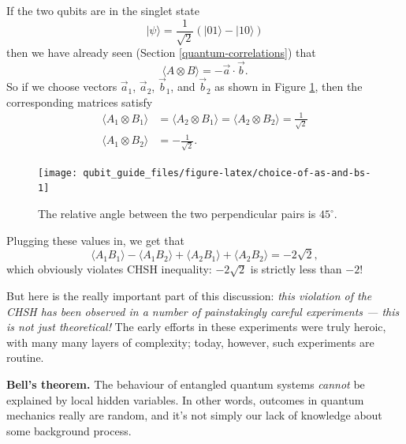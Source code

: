 \documentclass[fleqn,a4paper]{article}
\renewcommand{\footnote}[1]{\sidenotetext[{\color{white}0}\!\!]{\footnotesize #1}}
\newenvironment{idea}{\everypar{\setlength{\parindent}{1.5em}}}{}
\theoremstyle{definition}
\theoremstyle{definition}
\theoremstyle{definition}
\theoremstyle{definition}
\theoremstyle{remark}
\begin{document}
If the two qubits are in the singlet state
\[
  |\psi\rangle
  = \frac{1}{\sqrt{2}} \left( |01\rangle-|10\rangle \right)
\]
then we have already seen (Section \ref{quantum-correlations}) that
\[
  \langle A\otimes B\rangle = -\vec{a}\cdot\vec{b}.
\]
So if we choose vectors \(\vec{a}_1\), \(\vec{a}_2\), \(\vec{b}_1\), and \(\vec{b}_2\) as shown in Figure \ref{fig:choice-of-as-and-bs}, then the corresponding matrices\footnote{That is, \(A_1=\vec{a}_1\cdot\vec{\sigma}\), and so on.} satisfy
\[
\begin{aligned}
  \langle A_1\otimes B_1\rangle
  &= \langle A_2\otimes B_1\rangle
  = \langle A_2\otimes B_2\rangle
  = \frac{1}{\sqrt{2}}
\\\langle A_1\otimes B_2\rangle
  &= -\frac{1}{\sqrt{2}}.
\end{aligned}
\]



\begin{figure}[H]

{\centering \texttt{[image: qubit\_guide\_files/figure-latex/choice-of-as-and-bs-1]} 

}

\caption{The relative angle between the two perpendicular pairs is \(45^\circ\).}\label{fig:choice-of-as-and-bs}
\end{figure}

Plugging these values in, we get that
\[
  \langle A_1 B_1\rangle - \langle A_1 B_2\rangle + \langle A_2 B_1\rangle + \langle A_2 B_2\rangle
  = -2\sqrt{2},
\]
which obviously violates CHSH inequality: \(-2\sqrt{2}\) is strictly less than \(-2\)!

But here is the really important part of this discussion: \emph{this violation of the CHSH has been observed in a number of painstakingly careful experiments --- this is not just theoretical!}
The early efforts in these experiments were truly heroic, with many many layers of complexity; today, however, such experiments are routine.

\begin{idea}
\textbf{Bell's theorem.}
The behaviour of entangled quantum systems \emph{cannot} be explained by local hidden variables.
In other words, outcomes in quantum mechanics really are random, and it's not simply our lack of knowledge about some background process.

\end{idea}
\end{document}
